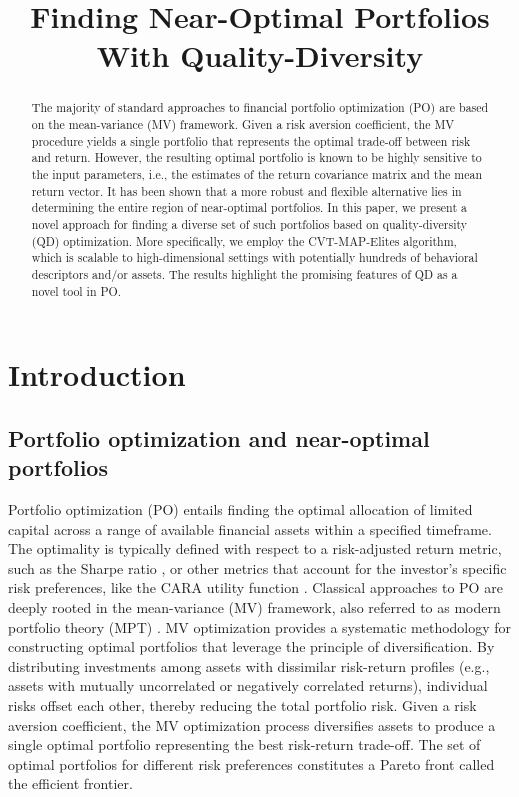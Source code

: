 
\title{Finding Near-Optimal Portfolios With Quality-Diversity}
\maketitle              \begin{abstract}
The majority of standard approaches to financial portfolio optimization (PO) are based on the mean-variance (MV) framework. Given a risk aversion coefficient, the MV procedure yields a single portfolio that represents the optimal trade-off between risk and return. However, the resulting optimal portfolio is known to be highly sensitive to the input parameters, i.e., the estimates of the return covariance matrix and the mean return vector. It has been shown that a more robust and flexible alternative lies in determining the entire region of near-optimal portfolios. In this paper, we present a novel approach for finding a diverse set of such portfolios based on quality-diversity (QD) optimization. More specifically, we employ the CVT-MAP-Elites algorithm, which is scalable to high-dimensional settings with potentially hundreds of behavioral descriptors and/or assets. The results highlight the promising features of QD as a novel tool in PO.

\end{abstract}
\section{Introduction}
\subsection{Portfolio optimization and near-optimal portfolios}

Portfolio optimization (PO) entails finding the optimal allocation of limited capital across a range of available financial assets within a specified timeframe. The optimality is typically defined with respect to a risk-adjusted return metric, such as the Sharpe ratio \cite{sharpe}, or other metrics that account for the investor's specific risk preferences, like the CARA utility function \cite{babcock}. Classical approaches to PO are deeply rooted in the mean-variance (MV) framework, also referred to as modern portfolio theory (MPT) \cite{markowitz}. MV optimization provides a systematic methodology for constructing optimal portfolios that leverage the principle of diversification. By distributing investments among assets with dissimilar risk-return profiles (e.g., assets with mutually uncorrelated or negatively correlated returns), individual risks offset each other, thereby reducing the total portfolio risk. Given a risk aversion coefficient, the MV optimization process diversifies assets to produce a single optimal portfolio representing the best risk-return trade-off. The set of optimal portfolios for different risk preferences constitutes a Pareto front called the efficient frontier.  


